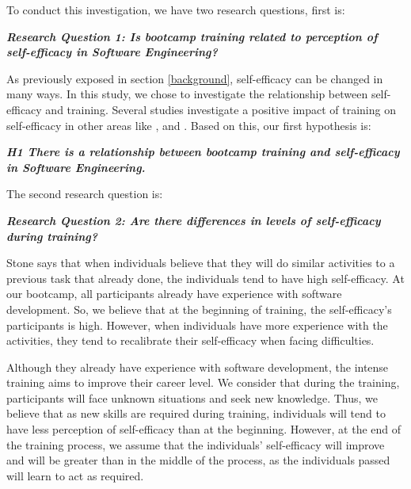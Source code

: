 \documentclass{TheMartianReport}
\begin{document}
To conduct this investigation, we have two research questions, first is:
 \newline

\textbf{\textit{Research Question 1: Is bootcamp training related to perception of self-efficacy in Software Engineering?}}
 \newline
 
As previously exposed in section \ref{background}, self-efficacy can be changed in many ways. In this study, we chose to investigate the relationship between self-efficacy and training. Several studies investigate a positive impact of training on self-efficacy in other areas like \cite{gist1989effects}, \cite{gist1989influence} and \cite{tannenbaum1991meeting}. Based on this, our first hypothesis is:
 \newline
   
\textbf{\textit{H1 There is a relationship between bootcamp training and self-efficacy in Software Engineering.}}
 \newline
   
The second research question is:
 \newline
 
\textbf{\textit{Research Question 2:  Are there differences in levels of self-efficacy during training?}}   
 \newline
 
 Stone \cite{stone1994overconfidence} says that when individuals believe that they will do similar activities to a previous task that already done, the individuals tend to have high self-efficacy. At our bootcamp, all participants already have experience with software development. So, we believe that at the beginning of training, the self-efficacy's participants is high. However, when individuals have more experience with the activities, they tend to recalibrate their self-efficacy when facing difficulties.

Although they already have experience with software development, the intense training aims to improve their career level. We consider that during the training, participants will face unknown situations and seek new knowledge. Thus, we believe that as new skills are required during training, individuals will tend to have less perception of self-efficacy than at the beginning. However, at the end of the training process, we assume that the individuals' self-efficacy will improve and will be greater than in the middle of the process, as the individuals passed will learn to act as required.
\end{document}
